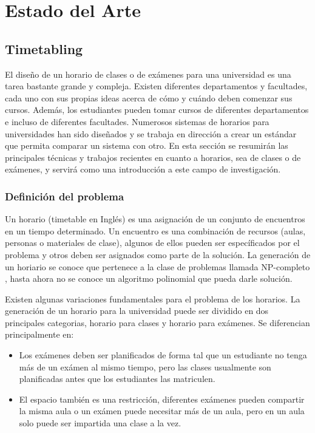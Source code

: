 \chapter{Estado del Arte}

\section{Timetabling}

El diseño de un horario de clases o de exámenes para una universidad es una tarea bastante grande y compleja.
Existen diferentes departamentos y facultades, cada uno con sus propias ideas acerca de cómo y cuándo deben
comenzar sus cursos. Además, los estudiantes pueden tomar cursos de diferentes departamentos e incluso de
diferentes facultades. Numerosos sistemas de horarios para universidades han sido diseñados y se trabaja
en dirección a crear un estándar que permita comparar un sistema con otro. En esta sección se resumirán
las principales técnicas y trabajos recientes en cuanto a horarios, sea de clases o de exámenes, y servirá
como una introducción a este campo de investigación.

\subsection{Definición del problema}

Un horario (timetable en Inglés) es una asignación de un conjunto de encuentros en un tiempo determinado.
Un encuentro es una combinación de recursos (aulas, personas o materiales de clase), algunos de ellos pueden
ser específicados por el problema y otros deben ser asignados como parte de la solución. La generación de un
horiario se conoce que pertenece a la clase de problemas llamada NP-completo \cite{TB Cooper and JH Kingston},
hasta ahora no se conoce un algoritmo polinomial que pueda darle solución.

Existen algunas variaciones fundamentales para el problema de los horarios. La generación de un horario para
la universidad puede ser dividido en dos principales categorias, horario para clases y horario para exámenes.
Se diferencian principalmente en:

\begin{itemize}
	\item Los exámenes deben ser planificados de forma tal que un estudiante no tenga más de un exámen al
		mismo tiempo, pero las clases usualmente son planificadas antes que los estudiantes las matriculen.
	\item El espacio también es una restricción, diferentes exámenes pueden compartir la misma aula o un exámen
		puede necesitar más de un aula, pero en un aula solo puede ser impartida una clase a la vez.
\end{itemize}

